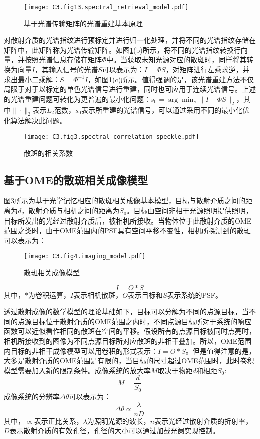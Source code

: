 \begin{figure}[htp]
	\centering
	\texttt{[image: C3.fig13.spectral\_retrieval\_model.pdf]}
	\caption{基于光谱传输矩阵的光谱重建基本原理}
	\label{fig:3.2}
\end{figure}

对散射介质的光谱指纹进行预标定并进行归一化处理，并将不同的光谱指纹存储在矩阵中，此矩阵称为光谱传输矩阵。如图\ref{fig:3.2}(b)所示，将不同的光谱指纹转换行向量，并按照光谱信息存储在矩阵$\Phi$中。当获取未知光源对应的散斑时，同样将其转换为向量$I$，其输入信号的光谱$S$可以表示为：$I={\Phi}S$，对矩阵进行左乘求逆，并求出最小二乘解：$S={\Phi}^{-1}I$，如图\ref{fig:3.2}(c)所示。值得强调的是，该光谱重建方法不仅局限于对于以标定的单色光谱信号进行重建，同时也可应用于连续光谱信号。上述的光谱重建问题可转化为更普遍的最小化问题：$s_{0}=\arg{\min_s \| I -{\Phi}S \|_2}$，其中$\| \cdot \|_2$表示$L_2$范数，$s_{0}$表示所重建的光谱信号，可以通过采用不同的最小化优化算法解决此问题。
\begin{figure}[htp]
	\centering
	\texttt{[image: C3.fig3.spectral\_correlation\_speckle.pdf]}
	\caption{散斑的相关系数}
	\label{fig:3.3}
\end{figure}
\subsection{基于OME的散斑相关成像模型}
图\ref{fig:3.4}所示为基于光学记忆相应的散斑相关成像基本模型，目标与散射介质之间的距离为$d$，散射介质与相机之间的距离为$S_{0}$。目标由空间非相干光源照明提供照明，目标所发出的光经过散射介质后，被相机所接收。当物体位于此散射介质的OME范围之类时，由于OME范围内的PSF具有空间平移不变性，相机所探测到的散斑可以表示为：
\begin{figure}[htp]
	\centering
	\texttt{[image: C3.fig4.imaging\_model.pdf]}
	\caption{散斑相关成像模型}
	\label{fig:3.4}
\end{figure}

\begin{equation}
    I = O*S
\label{eq:speckle_autocorrelation_imgaing}
\end{equation}其中，$*$为卷积运算，$I$表示相机散斑，$O$表示目标和$S$表示系统的PSF。

透过散射成像的数学模型的理论基础如下，目标可以分解为不同的点源目标，当不同的点源目标位于散射介质的OME范围之内时，不同点源目标所对于系统的响应函数可以近似看作相同的散斑在空间的平移。假设所有的点源目标被同时点亮时，相机所接收到的图像为不同点源目标所对应散斑的非相干叠加。所以，OME范围内目标的非相干成像模型可以用卷积的形式表示：$I = O*S$。但是值得注意的是，大多是散射介质的OME范围是有限的，当目标的尺寸超过OME范围时，此时卷积模型需要加入新的限制条件。成像系统的放大率$M$取决于物距$d$和相距$S_{0}$:
\begin{equation}
    M = \frac{d}{S_{0}}
\label{eq:magnification_imgaing_system}
\end{equation}
成像系统的分辨率$\Delta \theta $可以表示为：
\begin{equation}
    \Delta \theta   \propto \frac{\lambda}{nD}
\label{eq:angleresolution_imgaing_system}
\end{equation}
其中，$\propto$表示正比关系，$\lambda$为照明光源的波长，$n$表示光经过散射介质的折射率，$D$表示散射介质的有效孔径，孔径的大小可以通过加载光阑实现控制。

